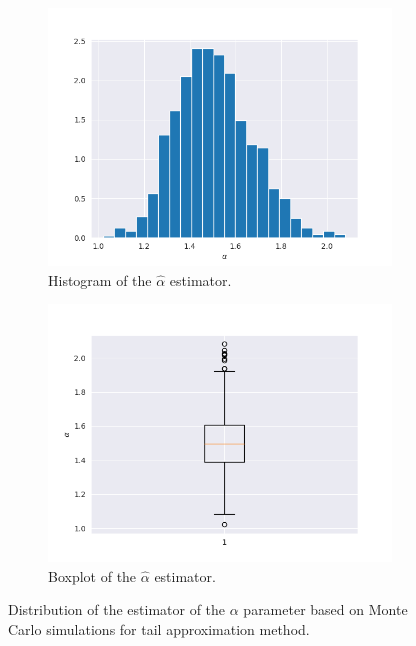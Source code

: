 \documentclass{article}
\begin{document}
		\begin{figure}[H]
			\begin{subfigure}{.5\textwidth}
				\centering
				\includegraphics[width=1\linewidth]{images/cdf_alpha_hist.png}
				\caption{Histogram of the $\hat\alpha$ estimator.				}
			\end{subfigure}
			\begin{subfigure}[r]{.5\textwidth}
				\centering
				\includegraphics[width=1\linewidth]{images/cdf_alpha_boxplot.png}
				\caption{Boxplot of the $\hat\alpha$ estimator.}
			\end{subfigure}
			\caption{Distribution of the estimator of the $\alpha$ parameter based on Monte Carlo simulations for tail approximation method.}\label{alpha1}
		\end{figure}
	
\end{document}
